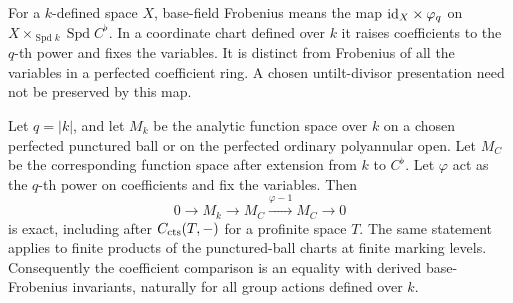 For a $k$-defined space $X$, base-field Frobenius means the
map $\mathrm{id}_X\times\varphi_q$ on
$X\times_{\operatorname{Spd}k}\operatorname{Spd}C^\flat$.
In a coordinate chart defined over $k$ it raises coefficients
to the $q$-th power and fixes the variables.  It is distinct
from Frobenius of all the variables in a perfected coefficient
ring.  A chosen untilt-divisor presentation need not be
preserved by this map.

\begin{lemma}\label{h3:ana:base-frobenius}
Let $q=|k|$, and let $M_k$ be the analytic function space over $k$
on a chosen perfected punctured ball or on the perfected ordinary
polyannular open.  Let $M_C$ be the corresponding function space after
extension from $k$ to $C^\flat$.  Let $\varphi$ act as the $q$-th power
on coefficients and fix the variables.  Then
\[
 0\longrightarrow M_k\longrightarrow M_C
      \xrightarrow{\varphi-1}M_C\longrightarrow0
\]
is exact, including after $C_{\mathrm{cts}}(T,-)$ for a profinite
space $T$.  The same statement applies to finite products
of the punctured-ball charts at finite marking levels.
Consequently the coefficient comparison is an equality
with derived base-Frobenius invariants, naturally for all
group actions defined over $k$.
\end{lemma}
